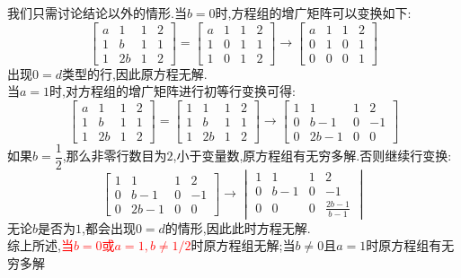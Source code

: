 \documentclass{ctexart}
\begin{document}
\begin{solution}
    我们只需讨论结论以外的情形.当$b=0$时,方程组的增广矩阵可以变换如下:
    \[\begin{bmatrix}
        a&1&1&2\\
        1&b&1&1\\
        1&2b&1&2
    \end{bmatrix}=\begin{bmatrix}
        a&1&1&2\\
        1&0&1&1\\
        1&0&1&2
    \end{bmatrix}\longrightarrow\begin{bmatrix}
        a&1&1&2\\
        0&1&0&1\\
        0&0&0&1
    \end{bmatrix}\]
    出现$0=d$类型的行,因此原方程无解.\\当$a=1$时,对方程组的增广矩阵进行初等行变换可得:
    \[\begin{bmatrix}
        a&1&1&2\\
        1&b&1&1\\
        1&2b&1&2
    \end{bmatrix}=\begin{bmatrix}
        1&1&1&2\\
        1&b&1&1\\
        1&2b&1&2
    \end{bmatrix}\longrightarrow\begin{bmatrix}
        1&1&1&2\\
        0&b-1&0&-1\\
        0&2b-1&0&0
    \end{bmatrix}\]
    如果$b=\dfrac12$,那么非零行数目为$2$,小于变量数,原方程组有无穷多解.否则继续行变换:
    \[\begin{bmatrix}
        1&1&1&2\\
        0&b-1&0&-1\\
        0&2b-1&0&0
    \end{bmatrix}\longrightarrow
    \begin{vmatrix}
        1&1&1&2\\
        0&b-1&0&-1\\
        0&0&0&\frac{2b-1}{b-1}
    \end{vmatrix}\]
    无论$b$是否为$1$,都会出现$0=d$的情形,因此此时方程无解.\\
    综上所述,\textcolor{red}{当$b=0$或$a=1,b\neq1/2$}时原方程组无解;当$b\neq0$且$a=1$时原方程组有无穷多解
\end{solution}
\end{document}
